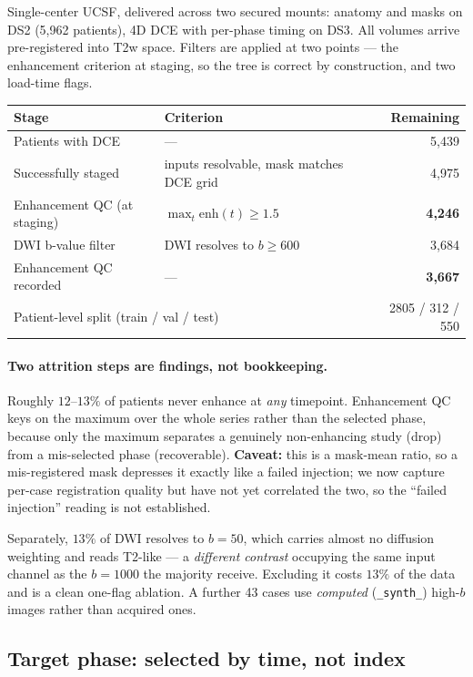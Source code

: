 \documentclass[11pt]{article}
\newcommand{\1}{\mathbb{1}}
\newcommand{\flag}[1]{\textcolor{red!60!black}{\textbf{#1}}}
\begin{document}
Single-center UCSF, delivered across two secured mounts: anatomy and masks on DS2
(5{,}962 patients), 4D DCE with per-phase timing on DS3. All volumes arrive pre-registered
into T2w space. Filters are applied at two points --- the enhancement criterion at staging,
so the tree is correct by construction, and two load-time flags.

\begin{center}
\begin{tabular}{llr}
\toprule
Stage & Criterion & Remaining \\
\midrule
Patients with DCE & --- & 5{,}439 \\
Successfully staged & inputs resolvable, mask matches DCE grid & 4{,}975 \\
Enhancement QC (at staging) & $\max_t \text{enh}(t)\ge1.5$ & \textbf{4{,}246} \\
DWI b-value filter & DWI resolves to $b\ge600$ & 3{,}684 \\
Enhancement QC recorded & --- & \textbf{3{,}667} \\
\midrule
\multicolumn{2}{l}{Patient-level split (train / val / test)} & 2805 / 312 / 550 \\
\bottomrule
\end{tabular}
\end{center}

\paragraph{Two attrition steps are findings, not bookkeeping.}
Roughly $12$--$13\%$ of patients never enhance at \emph{any} timepoint. Enhancement QC keys
on the maximum over the whole series rather than the selected phase, because only the
maximum separates a genuinely non-enhancing study (drop) from a mis-selected phase
(recoverable). \flag{Caveat:} this is a mask-mean ratio, so a mis-registered mask depresses
it exactly like a failed injection; we now capture per-case registration quality but have
not yet correlated the two, so the ``failed injection'' reading is not established.

Separately, $13\%$ of DWI resolves to $b{=}50$, which carries almost no diffusion weighting
and reads T2-like --- a \emph{different contrast} occupying the same input channel as the
$b{=}1000$ the majority receive. Excluding it costs $13\%$ of the data and is a clean
one-flag ablation. A further 43 cases use \emph{computed} (\texttt{\_synth\_}) high-$b$
images rather than acquired ones.

\subsection{Target phase: selected by time, not index}
\end{document}
